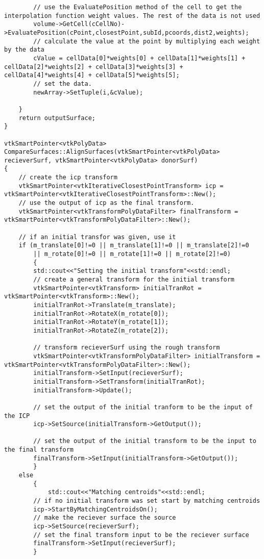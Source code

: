 \begin{lstlisting}
        // use the EvaluatePosition method of the cell to get the interpolation function weight values. The rest of the data is not used
        volume->GetCell(cCellNo)->EvaluatePosition(cPoint,closestPoint,subId,pcoords,dist2,weights);
        // calculate the value at the point by multiplying each weight by the data
        cValue = cellData[0]*weights[0] + cellData[1]*weights[1] + cellData[2]*weights[2] + cellData[3]*weights[3] + cellData[4]*weights[4] + cellData[5]*weights[5];
        // set the data.
        newArray->SetTuple(i,&cValue);

    }
    return outputSurface;
}

vtkSmartPointer<vtkPolyData> CompareSurfaces::AlignSurfaces(vtkSmartPointer<vtkPolyData> recieverSurf, vtkSmartPointer<vtkPolyData> donorSurf)
{
    // create the icp transform
    vtkSmartPointer<vtkIterativeClosestPointTransform> icp = vtkSmartPointer<vtkIterativeClosestPointTransform>::New();
    // use the output of icp as the final transform.
    vtkSmartPointer<vtkTransformPolyDataFilter> finalTransform = vtkSmartPointer<vtkTransformPolyDataFilter>::New();

    // if an initial transfor was given, use it
    if (m_translate[0]!=0 || m_translate[1]!=0 || m_translate[2]!=0
        || m_rotate[0]!=0 || m_rotate[1]!=0 || m_rotate[2]!=0)
        {
        std::cout<<"Setting the initial transform"<<std::endl;
        // create a general transform for the initial transform
        vtkSmartPointer<vtkTransform> initialTranRot = vtkSmartPointer<vtkTransform>::New();
        initialTranRot->Translate(m_translate);
        initialTranRot->RotateX(m_rotate[0]);
        initialTranRot->RotateY(m_rotate[1]);
        initialTranRot->RotateZ(m_rotate[2]);

        // transform recieverSurf using the rough transform
        vtkSmartPointer<vtkTransformPolyDataFilter> initialTransform = vtkSmartPointer<vtkTransformPolyDataFilter>::New();
        initialTransform->SetInput(recieverSurf);
        initialTransform->SetTransform(initialTranRot);
        initialTransform->Update();

        // set the output of the initial tranform to be the input of the ICP
        icp->SetSource(initialTransform->GetOutput());

        // set the output of the initial transform to be the input to the final transform
        finalTransform->SetInput(initialTransform->GetOutput());
        }
    else
        {
            std::cout<<"Matching centroids"<<std::endl;
        // if no initial transform was set start by matching centroids
        icp->StartByMatchingCentroidsOn();
        // make the reciever surface the source
        icp->SetSource(recieverSurf);
        // set the final transform input to be the reciever surface
        finalTransform->SetInput(recieverSurf);
        }


\end{lstlisting}
